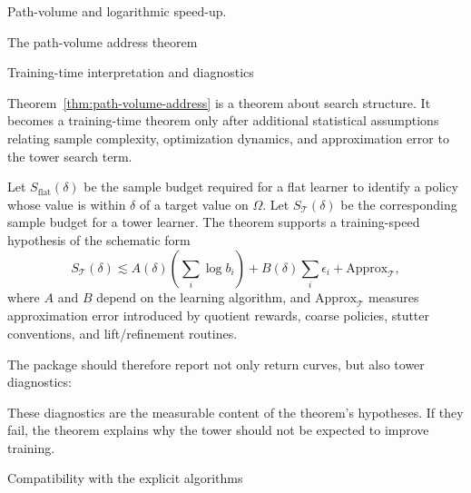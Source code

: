 \documentclass[11pt]{article}
\newcommand{\PVol}{\mathcal{P}\text{-}\mathrm{Vol}}
\begin{document}
\begin{section}{Path-volume and logarithmic speed-up.}
\begin{subsection}{The path-volume address theorem}
\end{subsection}

\begin{subsection}{Training-time interpretation and diagnostics}

Theorem~\ref{thm:path-volume-address} is a theorem about search structure. It becomes a training-time theorem only after additional statistical assumptions relating sample complexity, optimization dynamics, and approximation error to the tower search term.

Let $S_{\mathrm{flat}}(\delta)$ be the sample budget required for a flat learner to identify a policy whose value is within $\delta$ of a target value on $\Omega$. Let $S_{\mathcal T}(\delta)$ be the corresponding sample budget for a tower learner. The theorem supports a training-speed hypothesis of the schematic form
$$
S_{\mathcal T}(\delta)
\lesssim
A(\delta)\left(\sum_i\log b_i\right)
+
B(\delta)\sum_i\epsilon_i
+
\mathrm{Approx}_{\mathcal T},
$$
where $A$ and $B$ depend on the learning algorithm, and $\mathrm{Approx}_{\mathcal T}$ measures approximation error introduced by quotient rewards, coarse policies, stutter conventions, and lift/refinement routines.

The package should therefore report not only return curves, but also tower diagnostics:
\noindent
These diagnostics are the measurable content of the theorem's hypotheses. If they fail, the theorem explains why the tower should not be expected to improve training.

\end{subsection}

\begin{subsection}{Compatibility with the explicit algorithms}


\end{subsection}
\end{section}
\end{document}
